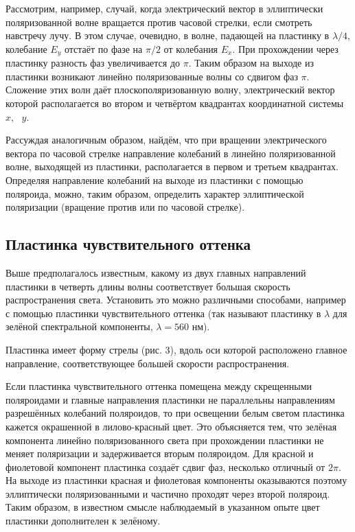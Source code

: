 \documentclass[a4paper,12pt]{article} %
\begin{document}
\hfill \break Рассмотрим, например, случай, когда электрический вектор в эллиптически поляризованной волне вращается против часовой стрелки, если смотреть навстречу лучу. В этом случае, очевидно, в волне, падающей на пластинку в $ \lambda/4 $, колебание $ E_y $ отстаёт по фазе на $ \pi/2 $ от колебания $ E_x $. При прохождении через пластинку разность фаз увеличивается до $ \pi $. Таким образом на выходе из пластинки возникают линейно поляризованные волны со сдвигом фаз $ \pi $. Сложение этих волн даёт плоскополяризованную волну, электрический вектор которой располагается во втором и четвёртом квадрантах координатной системы $x, \text{ } y$.

\hfill \break Рассуждая аналогичным образом, найдём, что при вращении электрического вектора по часовой стрелке направление колебаний в линейно поляризованной волне, выходящей из пластинки, располагается в первом и третьем квадрантах. Определяя направление колебаний на выходе из пластинки с помощью поляроида, можно, таким образом, определить характер эллиптической поляризации (вращение против или по часовой стрелке).

\subsection{Пластинка чувствительного оттенка}

\hfill \break Выше предполагалось известным, какому из двух главных направлений пластинки в четверть длины волны соответствует большая скорость распространения света. Установить это можно различными способами, например с помощью пластинки чувствительного оттенка (так называют пластинку в $ \lambda $ для зелёной спектральной компоненты, $ \lambda = 560 $ нм).

\hfill \break Пластинка имеет форму стрелы (рис. 3), вдоль оси которой расположено главное направление, соответствующее большей скорости распространения.

\hfill \break Если пластинка чувствительного оттенка помещена между скрещенными поляроидами и главные направления пластинки не параллельны направлениям разрешённых колебаний поляроидов, то при освещении белым светом пластинка кажется окрашенной в лилово-красный цвет. Это объясняется тем, что зелёная компонента линейно поляризованного света при прохождении пластинки не меняет поляризации и задерживается вторым поляроидом. Для красной и фиолетовой компонент пластинка создаёт сдвиг фаз, несколько отличный от $ 2\pi $. На выходе из пластинки красная и фиолетовая компоненты оказываются поэтому эллиптически поляризованными и частично проходят через второй поляроид. Таким образом, в известном смысле наблюдаемый в указанном опыте цвет пластинки дополнителен к зелёному.
\end{document}

